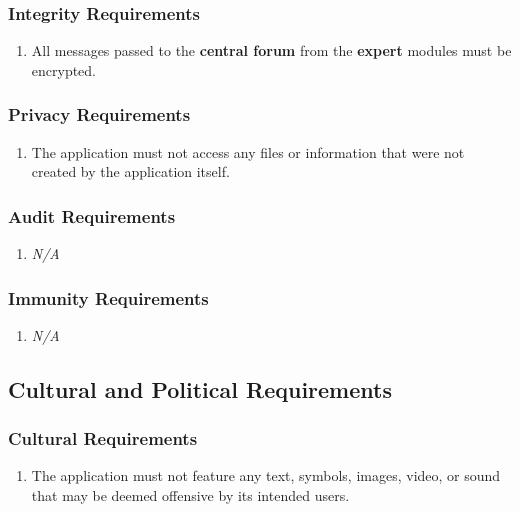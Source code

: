\documentclass[]{article}
\begin{document}
\cbstart
\subsubsection{Integrity Requirements}
\label{ssub:integrity_requirements}
\begin{enumerate}[{SR}2. ]
	\item All messages passed to the \textbf{central forum} from the \textbf{expert} modules must be encrypted.
\end{enumerate}
\cbend

\cbstart
\subsubsection{Privacy Requirements}
\label{ssub:privacy_requirements}
\begin{enumerate}[{SR}3. ]
	\item The application must not access any files or information that were not created by the application itself.
\end{enumerate}
\cbend

\subsubsection{Audit Requirements}
\label{ssub:audit_requirements}
\begin{enumerate}[{SR}1. ]
	\item \emph{N/A}
\end{enumerate}

\subsubsection{Immunity Requirements}
\label{ssub:immunity_requirements}
\begin{enumerate}[{SR}2. ]
	\item \emph{N/A}
\end{enumerate}


\subsection{Cultural and Political Requirements}
\label{sub:cultural_and_political_requirements}

\subsubsection{Cultural Requirements}
\label{ssub:cultural_requirements}
\begin{enumerate}[{CP}1. ]
	\item The application must not feature any text, symbols, images, video, or sound that may be deemed offensive by its intended users.
\end{enumerate}
\end{document}

